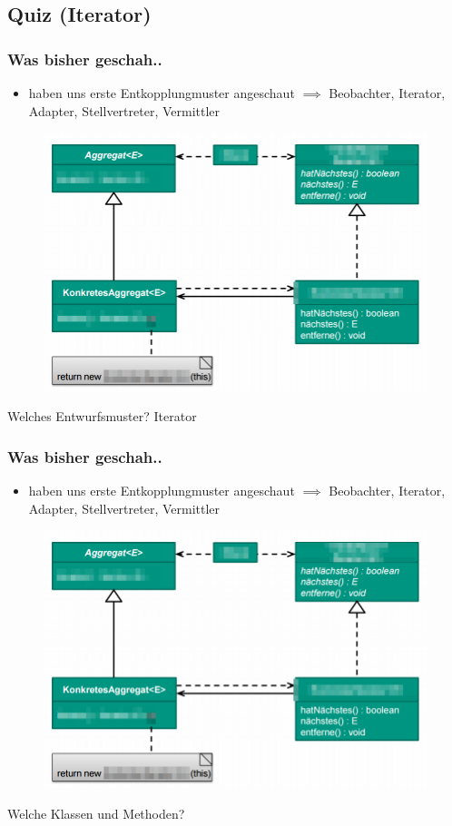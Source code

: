 \documentclass[18pt]{beamer}
\begin{document}
	\subsection{Quiz (Iterator)}
	\begin{frame}
		\frametitle{Was bisher geschah..}
		\begin{itemize}
			\item haben uns erste Entkopplungmuster angeschaut
			\linebreak $\implies$ Beobachter, Iterator, Adapter, Stellvertreter, Vermittler
		\end{itemize}
		\begin{figure}
			\includegraphics[scale=0.25]{./pics/tut4/iter-mod.png}
		\end{figure}
		Welches Entwurfsmuster? \pause Iterator
	\end{frame}
	
	\begin{frame}
		\frametitle{Was bisher geschah..}
		\begin{itemize}
			\item haben uns erste Entkopplungmuster angeschaut
			\linebreak $\implies$ Beobachter, Iterator, Adapter, Stellvertreter, Vermittler
		\end{itemize}
		\begin{figure}
			\includegraphics[scale=0.25]{./pics/tut4/iter-mod.png}
		\end{figure}
		Welche Klassen und Methoden?
	\end{frame}
	
\end{document}

